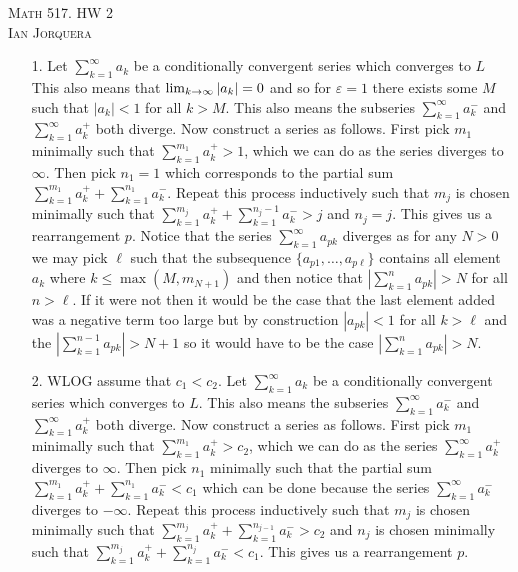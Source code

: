\documentclass[12pt]{amsart}
\begin{document}
\begin{center}
    \textsc{Math 517. HW 2\\ Ian Jorquera}
\end{center}
\vspace{1em}

\begin{itemize}
    \item[1.] Let $\sum_{k=1}^{\infty}{a_k}$ be a conditionally convergent series which
        converges to $L$ This also means that $\lim_{k\rightarrow\infty}|a_k|=0$ and so for
        $\varepsilon=1$ there exists some $M$ such that $|a_k|<1$ for all $k>M$. This
        also means the subseries $\sum_{k=1}^{\infty}{a^-_k}$ and
        $\sum_{k=1}^{\infty}{a^+_k}$ both diverge. Now construct a series as follows.
        First pick $m_1$ minimally such that $\sum_{k=1}^{m_1}{a^+_k}> 1$, which we can
        do as the series diverges to $\infty$. Then pick $n_1=1$ which corresponds to
        the partial sum $\sum_{k=1}^{m_1}{a^+_k}+\sum_{k=1}^{n_1}{a^-_k}$. Repeat this
        process inductively such that $m_j$ is chosen minimally such that
        $\sum_{k=1}^{m_j}{a^+_k}+\sum_{k=1}^{n_{j}-1}{a^-_k}> j$ and $n_j=j$. This
        gives us a rearrangement $p$. Notice that the series
        $\sum_{k=1}^{\infty}{a_{pk}}$ diverges as for any $N>0$ we may pick $\ell$ such
        that the subsequence $\{a_{p1},\dots,a_{p\ell}\}$ contains all element $a_k$
        where $k\leq\max{(M, m_{N+1})}$ and then notice that
        $|\sum_{k=1}^{n}{a_{pk}}|>N$ for all $n>\ell$. If it were not then it would be
        the case that the last element added was a negative term too large but by
        construction $|a_{pk}|<1$ for all $k>\ell$ and the
        $|\sum_{k=1}^{n-1}{a_{pk}}|>N+1$ so it would have to be the case
        $|\sum_{k=1}^{n}{a_{pk}}|>N$. 

    \item[2.]
        WLOG assume that $c_1<c_2$. Let $\sum_{k=1}^{\infty}{a_k}$ be a conditionally
        convergent series which converges to $L$. This also means the subseries
        $\sum_{k=1}^{\infty}{a^-_k}$ and $\sum_{k=1}^{\infty}{a^+_k}$ both diverge. Now
        construct a series as follows. First pick $m_1$ minimally such that
        $\sum_{k=1}^{m_1}{a^+_k}> c_2$, which we can do as the series
        $\sum_{k=1}^{\infty}{a^+_k}$ diverges to $\infty$. Then pick $n_1$ minimally
        such that the partial sum $\sum_{k=1}^{m_1}{a^+_k}+\sum_{k=1}^{n_1}{a^-_k}<c_1$
        which can be done because the series $\sum_{k=1}^{\infty}{a^-_k}$ diverges to
        $-\infty$. Repeat this process inductively such that $m_j$ is chosen minimally
        such that $\sum_{k=1}^{m_j}{a^+_k}+\sum_{k=1}^{n_{j-1}}{a^-_k}> c_2$ and $n_j$
        is chosen minimally such that
        $\sum_{k=1}^{m_j}{a^+_k}+\sum_{k=1}^{n_{j}}{a^-_k}< c_1$. This gives us a
        rearrangement $p$.


\end{itemize}
\end{document}
